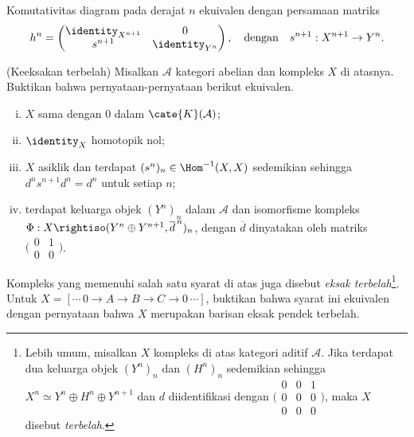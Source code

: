 \begin{Exercises}
	\begin{hint}
		Komutativitas diagram pada derajat $n$ ekuivalen dengan persamaan
		matriks
		\[
			h^n=
			\begin{pmatrix}
				\identity_{X^{n+1}}&0\\
				s^{n+1}&\identity_{Y^n}
			\end{pmatrix},
			\quad\text{dengan}\quad
			s^{n+1}:X^{n+1}\to Y^n.
		\]
	\end{hint}

	\item (Keeksakan terbelah) Misalkan $\mathcal{A}$ kategori abelian dan
	kompleks $X$ di atasnya. Buktikan bahwa pernyataan-pernyataan berikut
	ekuivalen.
	\begin{enumerate}[(i)]
		\item $X$ sama dengan $0$ dalam $\cate{K}(\mathcal{A})$;
		\item $\identity_X$ homotopik nol;
		\item $X$ asiklik dan terdapat
		$(s^n)_n\in\Hom^{-1}(X,X)$ sedemikian sehingga
		$d^ns^{n+1}d^n=d^n$ untuk setiap $n$;
		\item terdapat keluarga objek $(Y^n)_n$ dalam $\mathcal{A}$ dan
		isomorfisme kompleks
		$\Phi:X\rightiso(Y^n\oplus Y^{n+1},\overline d^{\,n})_n$, dengan
		$\overline d$ dinyatakan oleh matriks
		$\bigl(\begin{smallmatrix}0&1\\0&0\end{smallmatrix}\bigr)$.
	\end{enumerate}

	Kompleks yang memenuhi salah satu syarat di atas juga disebut
	\emph{eksak terbelah}\footnote{Lebih umum, misalkan $X$ kompleks di atas
	kategori aditif $\mathcal{A}$. Jika terdapat dua keluarga objek $(Y^n)_n$
	dan $(H^n)_n$ sedemikian sehingga
	$X^n\simeq Y^n\oplus H^n\oplus Y^{n+1}$ dan $d$ diidentifikasi dengan
	$\bigl(\begin{smallmatrix}0&0&1\\0&0&0\\0&0&0\end{smallmatrix}\bigr)$,
	maka $X$ disebut \emph{terbelah}.}.
	Untuk
	$X=[\cdots\,0\to A\to B\to C\to0\,\cdots]$, buktikan bahwa syarat ini
	ekuivalen dengan pernyataan bahwa $X$ merupakan barisan eksak pendek
	terbelah.


\end{Exercises}
